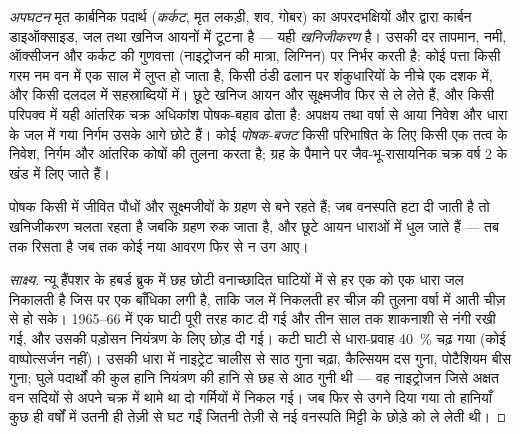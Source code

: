 \begin{definition}\label{def:b1:ecosystem-dynamics:decomposition}
\emph{अपघटन} मृत कार्बनिक पदार्थ (\emph{कर्कट}, मृत लकड़ी, शव, गोबर) का
अपरदभक्षियों और  द्वारा कार्बन डाइऑक्साइड, जल तथा खनिज आयनों में
टूटना है --- यही \emph{खनिजीकरण} है। उसकी दर तापमान, नमी, ऑक्सीजन और
कर्कट की गुणवत्ता (नाइट्रोजन की मात्रा, लिग्निन) पर निर्भर करती है: कोई
पत्ता किसी गरम नम वन में एक साल में लुप्त हो जाता है, किसी ठंडी ढलान पर
शंकुधारियों के नीचे एक दशक में, और किसी दलदल में सहस्राब्दियों में।
छूटे खनिज आयन  और सूक्ष्मजीव फिर से ले लेते हैं, और किसी परिपक्व
 में यही आंतरिक चक्र अधिकांश पोषक-बहाव ढोता है: अपक्षय तथा वर्षा
से आया निवेश और धारा के जल में गया निर्गम उसके आगे छोटे हैं। कोई
\emph{पोषक-बजट} किसी परिभाषित  के लिए किसी एक तत्व के निवेश,
निर्गम और आंतरिक कोषों की तुलना करता है; ग्रह के पैमाने पर जैव-भू-रासायनिक
चक्र वर्ष 2 के खंड में लिए जाते हैं।
\end{definition}

\begin{proposition}[जीवित समुदाय पोषक थामे रखता है]\label{prop:b1:ecosystem-dynamics:retention}
पोषक किसी  में जीवित पौधों और सूक्ष्मजीवों के ग्रहण से बने रहते
हैं; जब वनस्पति हटा दी जाती है तो खनिजीकरण चलता रहता है जबकि ग्रहण रुक
जाता है, और छूटे आयन धाराओं में धुल जाते हैं ---  तब तक रिसता है
जब तक कोई नया आवरण फिर से न उग आए।
\end{proposition}
\begin{proof}[साक्ष्य]
न्यू हैंपशर के हबर्ड ब्रुक में छह छोटी वनाच्छादित घाटियों में से हर एक को
एक धारा जल निकालती है जिस पर एक बाँधिका लगी है, ताकि जल में निकलती हर
चीज़ की तुलना वर्षा में आती चीज़ से हो सके। 1965--66 में एक घाटी पूरी तरह
काट दी गई और तीन साल तक शाकनाशी से नंगी रखी गई, और उसकी पड़ोसन नियंत्रण
के लिए छोड़ दी गई। कटी घाटी से धारा-प्रवाह \qty{40}{\%} चढ़ गया (कोई
वाष्पोत्सर्जन नहीं)। उसकी धारा में नाइट्रेट चालीस से साठ गुना चढ़ा,
कैल्सियम दस गुना, पोटैशियम बीस गुना; घुले पदार्थों की कुल हानि नियंत्रण
की हानि से छह से आठ गुनी थी --- वह नाइट्रोजन जिसे अक्षत वन सदियों से
अपने चक्र में थामे था दो गर्मियों में निकल गई। जब फिर से उगने दिया गया तो
हानियाँ कुछ ही वर्षों में उतनी ही तेज़ी से घट गईं जितनी तेज़ी से नई
वनस्पति मिट्टी के छोड़े को ले लेती थी।
\end{proof}

